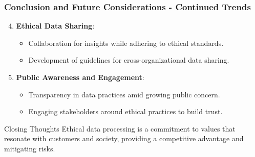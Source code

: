 \documentclass{beamer}
\begin{document}
\begin{frame}[fragile]
    \frametitle{Conclusion and Future Considerations - Continued Trends}
    \begin{enumerate}
        \setcounter{enumi}{3}
        \item \textbf{Ethical Data Sharing}:
        \begin{itemize}
            \item Collaboration for insights while adhering to ethical standards.
            \item Development of guidelines for cross-organizational data sharing.
        \end{itemize}
        
        \item \textbf{Public Awareness and Engagement}:
        \begin{itemize}
            \item Transparency in data practices amid growing public concern.
            \item Engaging stakeholders around ethical practices to build trust.
        \end{itemize}
    \end{enumerate}

    \begin{block}{Closing Thoughts}
        Ethical data processing is a commitment to values that resonate with customers and society, providing a competitive advantage and mitigating risks.
    \end{block}
\end{frame}
\end{document}

